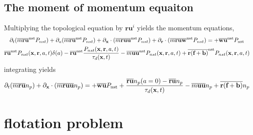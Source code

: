 \subsection*{The moment of momentum equaiton}
Multiplying the topological equation by $\textbf{r}\textbf{u}^i$ yields the momentum equations, 
\begin{multline}
    \partial_t (\overline{m\textbf{ru}}^\text{nst} P_{nst})
    + \partial_a (\overline{m\textbf{ru}}^\text{nst} P_{nst})
    + \partial_{\textbf{x}} \cdot (\overline{m\textbf{ru}\textbf{u} }^\text{nst} P_{nst})
    + \partial_{\textbf{r}}  \cdot (\overline{m\textbf{ru}\textbf{w}}^\text{nst} P_{nst})
    =  
    + \overline{\textbf{wu}}^\text{nst}P_\text{nst}
    \\
    \overline{\textbf{ru}}^\text{nst} P_{nst}(\textbf{x},\textbf{r},a,t)\delta(a)
    - \overline{\textbf{ru}}^\text{nst}  \frac{P_{nst}(\textbf{x},\textbf{r},a,t)}{\tau_d(\textbf{x},t)}
    - \overline{m\textbf{uu}}^\text{nst}P_{nst}(\textbf{x},\textbf{r},a,t)
    + \overline{\textbf{r}(\textbf{f}+\textbf{b})}^\text{nst}P_{nst}(\textbf{x},\textbf{r},a,t)
\end{multline}
integrating yields
\begin{multline}
    \partial_t (\overline{m\textbf{ru}} n_p)
    + \partial_{\textbf{x}} \cdot (\overline{m\textbf{ru}\textbf{u} } n_p)
    =  
    + \overline{\textbf{wu}}P_\text{nst}
    +  \frac{\overline{\textbf{ru}}n_p(a=0) -\overline{\textbf{ru}} n_p}{\tau_d(\textbf{x},t)}
    - \overline{m\textbf{uu}}n_p 
    + \overline{\textbf{r}(\textbf{f}+\textbf{b})}n_p 
\end{multline}

\section{flotation problem}

